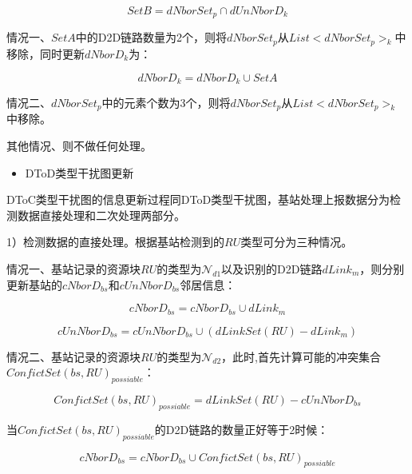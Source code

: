 \documentclass[figurelist,tablelist,algorithmlist,nomlist,masters]{seuthesix}
\begin{document}
	\begin{equation}\label{eq2.19}
	SetB = dNborSet_{p} \cap dUnNborD_k
	\end{equation}
	
	情况一、$SetA$中的D2D链路数量为2个，则将$dNborSet_{p}$从$List < dNborSet_{p}{ > _k}$中移除，同时更新$dNborD_k$为：
	
	\begin{equation}\label{eq2.20}
	dNborD_k = dNborD_k \cup SetA
	\end{equation}
	
	情况二、$dNborSet_{p}$中的元素个数为3个，则将$dNborSet_{p}$从$List < dNborSet_{p}{ > _k}$中移除。
	
	其他情况、则不做任何处理。
	
	
	\begin{itemize}
		\item DToD类型干扰图更新
	\end{itemize}
	
	DToC类型干扰图的信息更新过程同DToD类型干扰图，基站处理上报数据分为检测数据直接处理和二次处理两部分。
	
	1）检测数据的直接处理。根据基站检测到的$RU$类型可分为三种情况。
	
	情况一、基站记录的资源块$RU$的类型为$\mathcal{N}_{d1}$以及识别的D2D链路$dLink_m$，则分别更新基站的$cNborD_{bs}$和$cUnNborD_{bs}$邻居信息：
	
	\begin{equation}\label{eq2.21}
	cNborD_{bs} = cNborD_{bs} \cup dLink_m
	\end{equation}
	
	\begin{equation}\label{eq2.22}
	cUnNborD_{bs} = cUnNborD_{bs} \cup (dLinkSet(RU) - dLink_m)
	\end{equation}
	
	情况二、基站记录的资源块$RU$的类型为$\mathcal{N}_{d2}$，此时,首先计算可能的冲突集合$ConfictSet{(bs,RU)_{possiable}}$：
	
	\begin{equation}\label{eq2.23}
	ConfictSet{(bs,RU)_{possiable}} = dLinkSet(RU) - cUnNborD_{bs}
	\end{equation}
	
	
	当$ConfictSet{(bs,RU)_{possiable}}$的D2D链路的数量正好等于2时候：
	
	\begin{equation}\label{eq2.24}
	cNborD_{bs} = cNborD_{bs} \cup ConfictSet{(bs,RU)_{possiable}}
	\end{equation}
	
\end{document}
